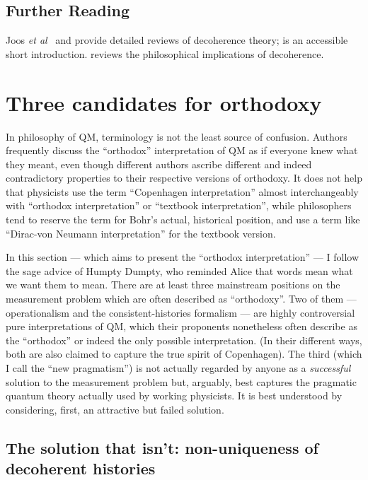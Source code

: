 \documentclass[12pt]{article}
\begin{document}
\subsection{Further Reading}\label{DMWWdecoherencefurtherreading}

Joos \emph{et al}~\citeyear{joosetal} and  provide detailed reviews of decoherence theory;  is an  accessible short introduction.  reviews the philosophical implications of decoherence.

\section{Three candidates for orthodoxy}\label{DMWW3candidates}

In philosophy of QM, terminology is not the least source of confusion. Authors frequently discuss the ``orthodox'' interpretation of QM as if everyone knew what they meant, even though different authors ascribe different and indeed contradictory properties to their respective versions of orthodoxy. It does not help that physicists use the term ``Copenhagen interpretation'' almost interchangeably with ``orthodox interpretation'' or ``textbook interpretation'', while philosophers tend to reserve the term for Bohr's actual, historical position, and use a term like ``Dirac-von Neumann interpretation'' for the textbook version.

In this section --- which aims to present the ``orthodox interpretation'' --- I follow the sage advice of Humpty Dumpty, who reminded Alice that words mean what we want them to mean. There are at least three mainstream positions on the measurement problem which are often described as ``orthodoxy''. Two of them --- operationalism and the consistent-histories formalism --- are highly controversial pure interpretations of QM, which their proponents nonetheless often describe as the ``orthodox'' or indeed the only possible interpretation. (In their different ways, both are also claimed to capture the true spirit of Copenhagen). The third (which I call the ``new pragmatism'') is not actually regarded by anyone as a \emph{successful} solution to the measurement problem but, arguably, best captures the pragmatic quantum theory actually used by working physicists. It is best understood by considering, first, an attractive but failed solution.

\subsection{The solution that isn't: non-uniqueness of decoherent histories}\label{DMWWsolutionthatisnt}
\end{document}
